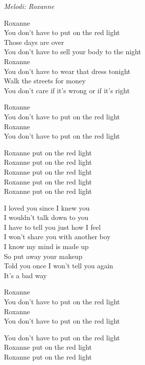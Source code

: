 {\footnotesize\textit{Melodi: Roxanne}}\par
\vspace{10pt}
Roxanne\\
You don't have to put on the red light\\
Those days are over\\
You don't have to sell your body to the night\\
Roxanne\\
You don't have to wear that dress tonight\\
Walk the streets for money\\
You don't care if it's wrong or if it's right\par
\vspace{10pt}
Roxanne\\
You don't have to put on the red light\\
Roxanne\\
You don't have to put on the red light\par
\vspace{10pt}
Roxanne put on the red light\\
Roxanne put on the red light\\
Roxanne put on the red light\\
Roxanne put on the red light\\
Roxanne put on the red light\par
\vspace{10pt}
I loved you since I knew you\\
I wouldn't talk down to you\\
I have to tell you just how I feel\\
I won't share you with another boy\\
I know my mind is made up\\
So put away your makeup\\
Told you once I won't tell you again\\
It's a bad way\par
\newpage
Roxanne\\
You don't have to put on the red light\\
Roxanne\\
You don't have to put on the red light\par
\vspace{10pt}
You don't have to put on the red light\\
Roxanne put on the red light\\
Roxanne put on the red light\\
